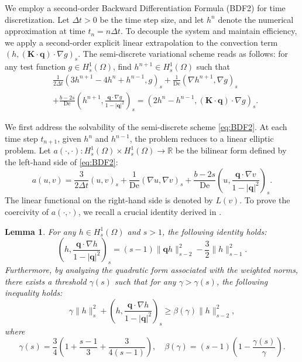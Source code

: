 \documentclass[preprint,12pt]{elsarticle}
\newtheorem{lemma}{Lemma}[section]
\begin{document}
We employ a second-order Backward Differentiation Formula (BDF2) for time discretization. Let $\Delta t > 0$ be the time step size, and let $h^n$ denote the numerical approximation at time $t_n = n\Delta t$. To decouple the system and maintain efficiency, we apply a second-order explicit linear extrapolation to the convection term $(h,(\boldsymbol{K}\cdot\boldsymbol{q})\cdot \nabla g)_s$. The semi-discrete variational scheme reads as follows: for any test function $g \in H_s^1(\Omega)$, find $h^{n+1}\in H_s^1(\Omega)$ such that
\begin{equation} 
\label{eq:BDF2}
\begin{aligned}
    & \frac{1}{2\Delta t}\left(3h^{n+1}-4h^{n}+h^{n-1}, g\right)_s + \frac{1}{\text{De}}\left(\nabla h^{n+1},\nabla g\right)_s \\
    &+\frac{b-2s}{\text{De}}\left(h^{n+1},\frac{\bm{q}\cdot \nabla g}{1-|\bm{q}|^2}\right)_s 
    = (2h^{n}-h^{n-1}, (\bm{K}\cdot\bm{q})\cdot\nabla g)_s.
\end{aligned}
\end{equation}

We first address the solvability of the semi-discrete scheme \eqref{eq:BDF2}. At each time step $t_{n+1}$, given $h^n$ and $h^{n-1}$, the problem reduces to a linear elliptic problem. Let $a(\cdot, \cdot): H_s^1(\Omega) \times H_s^1(\Omega) \to \mathbb{R}$ be the bilinear form defined by the left-hand side of \eqref{eq:BDF2}:
\begin{equation}
    a(u, v) = \frac{3}{2\Delta t}(u, v)_s + \frac{1}{\text{De}}(\nabla u, \nabla v)_s + \frac{b-2s}{\text{De}}\left(u, \frac{\bm{q}\cdot \nabla v}{1-|\bm{q}|^2}\right)_s.
\end{equation}
The linear functional on the right-hand side is denoted by $L(v)$. To prove the coercivity of $a(\cdot, \cdot)$, we recall a crucial identity derived in \cite{Shen12}.

\begin{lemma}
\label{lem:Shen_identity}
For any $h \in H_s^1(\Omega)$ and $s > 1$, the following identity holds:
\begin{equation} \label{eq:identity}
    \left(h, \frac{\bm{q}\cdot \nabla h}{1-|\bm{q}|^2}\right)_s = (s-1)\|\bm{q}h\|_{s-2}^2 - \frac{3}{2}\|h\|_{s-1}^2.
\end{equation}
Furthermore, by analyzing the quadratic form associated with the weighted norms, there exists a threshold $\gamma(s)$ such that for any $\gamma > \gamma(s)$, the following inequality holds:
\begin{equation} \label{eq:positivity}
    \gamma \|h\|_s^2 + \left(h, \frac{\bm{q}\cdot \nabla h}{1-|\bm{q}|^2}\right)_s \ge \beta(\gamma)\|h\|_{s-2}^2,
\end{equation}
where 
\begin{equation}
    \gamma(s) = \frac{3}{4}\left(1 + \frac{s-1}{3} + \frac{3}{4(s-1)}\right), \quad \beta(\gamma) = (s-1)\left(1 - \frac{\gamma(s)}{\gamma}\right).
\end{equation}
\end{lemma}
\end{document}
